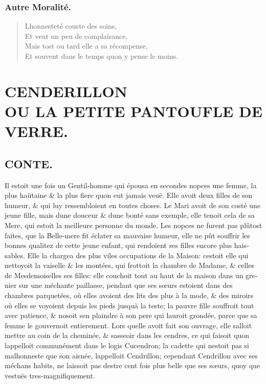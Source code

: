 \documentclass[14pt,a4paper]{memoir}
\newcommand{\notechapter}[1]{%
  \addtonotes{\protect\section*{#1}}%
}
\newcommand{\notesection}[1]{%
  \addtonotes{\protect\par\protect\vspace{2ex}\protect\noindent\textbf{#1}\protect\par\protect\vspace{1ex}}%
}
\begin{document}
{{\begin{otherlanguage}{french}
\begin{verse}
\end{verse}

\subsection{Autre Moralité.}

\begin{verse}
  \small
L\textquotesingle honnesteté couste des soins, \\
Et veut un peu de complaisance, \\
Mais tost ou tard elle a sa récompense, \\
Et souvent dans le temps qu\textquotesingle on y pense le moins.
\end{verse}

\chapter[CENDERILLION]{CENDERILLON\\ [1ex] \large OU LA PETITE PANTOUFLE DE VERRE.}
\notechapter{CENDERILLION}

\section{CONTE.}
\notesection{CONTE.}

Il estoit une fois un Gentil-homme qui épousa en secondes nopces une
femme, la plus haütaine \& la plus fiere qu\textquotesingle on eut
jamais veuë. Elle avoit deux filles de son humeur, \& qui luy
ressembloient en toutes choses. Le Mari avoit de son costé une jeune
fille, mais d\textquotesingle une douceur \& d\textquotesingle une bonté
sans exemple, elle tenoit cela de sa Mere, qui estoit la meilleure
personne du monde. Les nopces ne furent pas plûtost faites, que la
Belle-mere fit éclater sa mauvaise humeur, elle ne pût souffrir les
bonnes qualitez de cette jeune enfant, qui rendoient ses filles encore
plus haissables. Elle la chargea des plus viles occupations de la
Maison: c\textquotesingle estoit elle qui nettoyoit la vaiselle \& les
montées, qui frottoit la chambre de Madame, \& celles de Mesdemoiselles
ses filles: elle couchoit tout au haut de la maison dans un grenier sur
une méchante paillasse, pendant que ses sœurs estoient dans des chambres
parquetées, où elles avoient des lits des plus à la mode, \& des miroirs
où elles se voyoient depuis les pieds jusqu\textquotesingle à la teste;
la pauvre fille souffroit tout avec patience, \& n\textquotesingle osoit
s\textquotesingle en plaindre à son pere qui l\textquotesingle auroit
grondée, parce que sa femme le gouvernoit entierement. Lors quelle avoit
fait son ouvrage, elle s\textquotesingle alloit mettre au coin de la
cheminée, \& s\textquotesingle asseoir dans les cendres, ce qui faisoit
qu\textquotesingle on l\textquotesingle appelloit communément dans le
logis Cucendron; la cadette qui n\textquotesingle estoit pas si
malhonneste que son aisnée, l\textquotesingle appelloit Cendrillon;
cependant Cendrillon avec ses méchans habits, ne laissoit pas
d\textquotesingle estre cent fois plus belle que ses sœurs, quoy que
vestuës tres-magnifiquement.


\end{otherlanguage}}}
\end{document}
